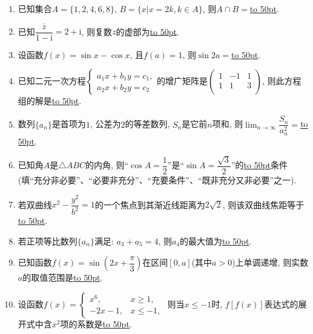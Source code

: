 \documentclass[10pt,a4paper]{article}
\newcommand{\blank}[1]{\underline{\hbox to #1pt{}}}
\begin{document}
\begin{enumerate}[1.]
\item 已知集合$A=\{1,2,4,6,8\}$, $B=\{x|x=2k,k\in A\}$, 则$A\cap B=$\blank{50}.
\item 已知$\dfrac{\overline z}{1-\mathrm{i}}=2+\mathrm{i}$, 则复数$z$的虚部为\blank{50}.
\item 设函数$f(x)=\sin x-\cos x$, 且$f(a)=1$, 则$\sin 2a=$\blank{50}.
\item 已知二元一次方程$\begin{cases} {a_1}x+{b_1}y={c_1}, \\  {a_2}x+{b_2}y={c_2} \end{cases}$的增广矩阵是$\begin{pmatrix} 1 & -1 & 1 \\  1 & 1 & 3 \\ \end{pmatrix}$, 则此方程组的解是\blank{50}.
\item 数列$\{a_n\}$是首项为$1$, 公差为$2$的等差数列, $S_n$是它前$n$项和, 则$\displaystyle\lim_{n\to\infty}\dfrac{S_n}{a_n^2}=$\blank{50}.
\item 已知角$A$是$\triangle ABC$的内角, 则``$\cos A=\dfrac12$''是``$\sin A=\dfrac{\sqrt3}2$''的\blank{50}条件(填``充分非必要''、``必要非充分''、``充要条件''、``既非充分又非必要''之一).
\item 若双曲线$x^2-\dfrac{y^2}{b^2}=1$的一个焦点到其渐近线距离为$2\sqrt2$, 则该双曲线焦距等于\blank{50}.
\item 若正项等比数列$\{a_n\}$满足: $a_3+a_5=4$, 则$a_4$的最大值为\blank{50}.
\item 已知函数$f(x)=\sin (2x+\dfrac\pi 3)$在区间$[0,a]$(其中$a>0$)上单调递增, 则实数$a$的取值范围是\blank{50}.
\item 设函数$f(x)=\begin{cases}    x^6, & x\ge 1,  \\   -2x-1, & x\le -1, \end{cases}$ 则当$x\le -1$时, $f[f(x)]$表达式的展开式中含${x^2}$项的系数是\blank{50}.



\end{enumerate}
\end{document}
